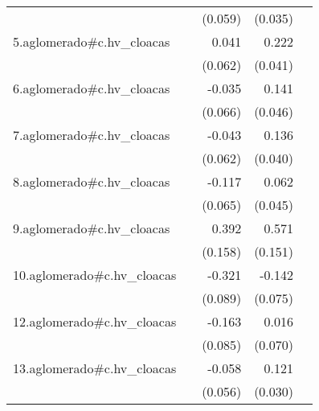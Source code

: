 {\begin{longtable}{l*{4}{D{.}{.}{-1}}}
            &                     &     (0.059)         &     (0.035)         &                     \\
\addlinespace
5.aglomerado#c.hv\_cloacas&                     &       0.041         &       0.222\sym{***}&                     \\
            &                     &     (0.062)         &     (0.041)         &                     \\
\addlinespace
6.aglomerado#c.hv\_cloacas&                     &      -0.035         &       0.141\sym{**} &                     \\
            &                     &     (0.066)         &     (0.046)         &                     \\
\addlinespace
7.aglomerado#c.hv\_cloacas&                     &      -0.043         &       0.136\sym{***}&                     \\
            &                     &     (0.062)         &     (0.040)         &                     \\
\addlinespace
8.aglomerado#c.hv\_cloacas&                     &      -0.117         &       0.062         &                     \\
            &                     &     (0.065)         &     (0.045)         &                     \\
\addlinespace
9.aglomerado#c.hv\_cloacas&                     &       0.392\sym{*}  &       0.571\sym{***}&                     \\
            &                     &     (0.158)         &     (0.151)         &                     \\
\addlinespace
10.aglomerado#c.hv\_cloacas&                     &      -0.321\sym{***}&      -0.142         &                     \\
            &                     &     (0.089)         &     (0.075)         &                     \\
\addlinespace
12.aglomerado#c.hv\_cloacas&                     &      -0.163         &       0.016         &                     \\
            &                     &     (0.085)         &     (0.070)         &                     \\
\addlinespace
13.aglomerado#c.hv\_cloacas&                     &      -0.058         &       0.121\sym{***}&                     \\
            &                     &     (0.056)         &     (0.030)         &                     \\

\end{longtable}}
